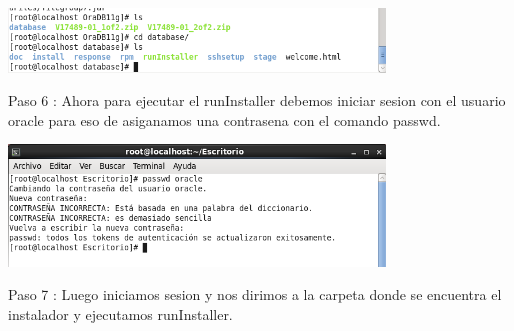 \documentclass[12pt,letterpaper]{article}
\begin{document}
\begin{center}
\includegraphics[width=10cm]{./oraclelinux/8.png}
\end{center}
Paso 6 : Ahora para ejecutar el runInstaller debemos iniciar sesion con el usuario oracle para eso de asiganamos una contrasena con el comando passwd.
\begin{center}
\includegraphics[width=10cm]{./oraclelinux/9.png}
\end{center}

Paso 7 : Luego iniciamos sesion y nos dirimos a la carpeta donde se encuentra el instalador y ejecutamos runInstaller.
\end{document}
